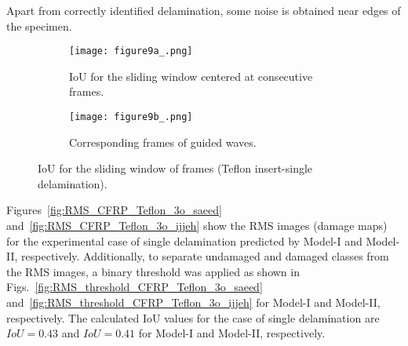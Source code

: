\begin{sloppypar}
	Apart from correctly identified delamination, some noise is obtained near edges of the specimen.
	\begin{figure} [!ht]
		\begin{subfigure}[b]{1\textwidth}
			\centering
			\texttt{[image: figure9a\_.png]}
			\caption{IoU for the sliding window centered at consecutive frames.}
			\label{fig:CFRP_Teflon_3o_IoU_}
		\end{subfigure}
		\par\medskip
		\begin{subfigure}[b]{1\textwidth}
			\centering
			\texttt{[image: figure9b\_.png]}
			\caption{Corresponding frames of guided waves.} 
			\label{fig:CFRP_teflon_3o_shapes_}
		\end{subfigure}
		\caption{IoU for the sliding window of frames (Teflon insert-single delamination).}
		\label{fig:CFRP_Teflon_3o_IoU_centre_window}
	\end{figure} 
	
	Figures~\ref{fig:RMS_CFRP_Teflon_3o_saeed} and~\ref{fig:RMS_CFRP_Teflon_3o_ijjeh} show the RMS images (damage maps) for the experimental case of single delamination predicted by Model-I and Model-II, respectively.
	Additionally, to separate undamaged and damaged classes from the RMS images, a binary threshold was applied as shown in Figs.~\ref{fig:RMS_threshold_CFRP_Teflon_3o_saeed} and~\ref{fig:RMS_threshold_CFRP_Teflon_3o_ijjeh} for Model-I and Model-II, respectively. 
	The calculated IoU values for the case of single delamination are \(IoU=0.43\) and \(IoU=0.41\) for Model-I and Model-II, respectively.
	

\end{sloppypar}
